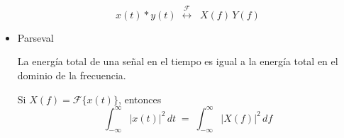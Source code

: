 \begin{itemize}
        \[
        x(t) * y(t)\;\overset{\mathcal{F}}{\longleftrightarrow}\;
       \;  X(f)\,Y(f)
        \]
       
    \item Parseval

        La energía total de una señal en el tiempo es igual a la energía total en el dominio de la frecuencia.

        Si $X(f) = \mathcal{F}\{x(t)\}$, entonces
        \[
        \int_{-\infty}^{\infty} |x(t)|^2 \, dt \;=\; \int_{-\infty}^{\infty} |X(f)|^2 \, df
        \]
        
\end{itemize}
